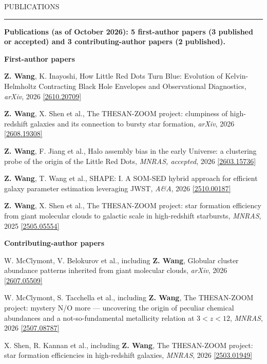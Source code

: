 \documentclass{resume} %
\newcommand{\myname}{\textcolor{CarnegieMellonRed}{\textbf{Z. Wang}}}
\newcommand{\pubentry}[6]{\noindent[#1] #2, #3, \textit{#4}, #5 \href{https://arxiv.org/abs/#6}{[#6]}\par}
\renewenvironment{rSection}[1]{
\sectionskip
\textcolor{CarnegieMellonRed}{\MakeUppercase{#1}}
\sectionlineskip
\hrule
\begin{list}{}{
\setlength{\leftmargin}{1.5em}
}
\item[]
}{
\end{list}
}
\begin{document}


\begin{rSection}{Publications} \itemsep -2pt
{\bf Publications (as of October 2026): 5 first-author papers (3 published or accepted) and 3 contributing-author papers (2 published).}

{\bf First-author papers}\par
\pubentry{1}{\myname, K. Inayoshi}{How Little Red Dots Turn Blue: Evolution of Kelvin-Helmholtz Contracting Black Hole Envelopes and Observational Diagnostics}{arXiv}{2026}{2610.20709}
\pubentry{2}{\myname, X. Shen et al.}{The THESAN-ZOOM project: clumpiness of high-redshift galaxies and its connection to bursty star formation}{arXiv}{2026}{2608.19308}
\pubentry{3}{\myname, F. Jiang et al.}{Halo assembly bias in the early Universe: a clustering probe of the origin of the Little Red Dots}{MNRAS, accepted}{2026}{2603.15736}
\pubentry{4}{\myname, T. Wang et al.}{SHAPE: I. A SOM-SED hybrid approach for efficient galaxy parameter estimation leveraging JWST}{A\&A}{2026}{2510.00187}
\pubentry{5}{\myname, X. Shen et al.}{The THESAN-ZOOM project: star formation efficiency from giant molecular clouds to galactic scale in high-redshift starbursts}{MNRAS}{2025}{2505.05554}

{\bf Contributing-author papers}\par
\pubentry{6}{W. McClymont, V. Belokurov et al., including \myname}{Globular cluster abundance patterns inherited from giant molecular clouds}{arXiv}{2026}{2607.05509}
\pubentry{7}{W. McClymont, S. Tacchella et al., including \myname}{The THESAN-ZOOM project: mystery N/O more --- uncovering the origin of peculiar chemical abundances and a not-so-fundamental metallicity relation at $3<z<12$}{MNRAS}{2026}{2507.08787}
\pubentry{8}{X. Shen, R. Kannan et al., including \myname}{The THESAN-ZOOM project: star formation efficiencies in high-redshift galaxies}{MNRAS}{2026}{2503.01949}

\end{rSection}
\end{document}
